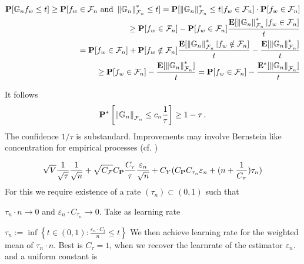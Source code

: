 \begin{align}
  \P[
  \mathbb{G}_n f_w \le t
  ]
  \ge
  \P[
  f_w \in \mathcal{F}_n
  \ \text{and}\ 
  \norm{\G_n}_{\mathcal{F}_n}^*
  \le t
  ]
  =
  \P[
  \norm{\G_n}_{\mathcal{F}_n}^*
  \le t
  |
  f_w \in \mathcal{F}_n
  ]
  \cdot
  \P[
  f_w \in \mathcal{F}_n
  ]
  \\
  \ge
  \P[
  f_w \in \mathcal{F}_n
  ]
  -
  \P[
  f_w \in \mathcal{F}_n
  ]
  \frac{
    \E[
  \norm{\G_n}_{\mathcal{F}_n}^*
  |
  f_w \in \mathcal{F}_n
  ]
  }{t}
  \\
  =
  \P[
  f_w \in \mathcal{F}_n
  ]
  +
  \P[
  f_w \notin \mathcal{F}_n
  ]
  \frac{
    \E[
  \norm{\G_n}_{\mathcal{F}_n}^*
  |
  f_w \notin \mathcal{F}_n
  ]
  }{t}
  -
  \frac{
    \E[
  \norm{\G_n}_{\mathcal{F}_n}^*
    ]
  }{t}
  \\
  \ge
  \P[
  f_w \in \mathcal{F}_n
  ]
  -
  \frac{
    \E[
  \norm{\G_n}_{\mathcal{F}_n}^*
    ]
  }{t}
  =
  \P[
  f_w \in \mathcal{F}_n
  ]
  -
  \frac{
    \E^*[
  \norm{\G_n}_{\mathcal{F}_n}
    ]
  }{t}
\end{align}


It follows
\begin{gather}
  \P^*\left[ 
    \norm{\G_n}_{\mathcal{F}_n}
    \le c_n \frac{1}{\tau}
  \right]
  \ge
  1-\tau
   \,.
\end{gather}
The confidence $1/\tau$ is substandard. Improvements may involve Bernstein like concentration for empirical processes (cf. \cite[Section~2.14.2]{vaart2013})

\begin{gather}
  \sqrt{V}\frac{1}{\sqrt{\tau}}\frac{1}{\sqrt{n}}
  +
  \sqrt{C_\mathcal{F}}
  C_\P
  \frac{C_\tau}{\tau}
  \frac{\varepsilon_n}{\sqrt{n}}
  +
  C_Y
  (
  C_\P 
  C_{\tau_n}
  \varepsilon_n
  +
  (n
  +
  \frac{1}{C_\pi}
  )
  \tau_n
  )
\end{gather}
For this we require
existence of a rate $(\tau_n) \subset (0,1)
$
such that

$
\tau_n\cdot n \to 0
$
and
$
\varepsilon_n
\cdot
  C_{\tau_n}
  \to 0
$.
Take as learning rate 

$
\tau_n
:=
\inf
\left\{ 
t \in (0,1)
\colon
\frac{
\varepsilon_n
\cdot
  C_{t}
}{n}
  \le
  t
\right\}
$
We then achieve learning rate for the weighted mean of $\tau_n\cdot n$.
Best is $C_\tau=1$, when we recover the learnrate of the estimator $\varepsilon_n$.
and a uniform constant is 


